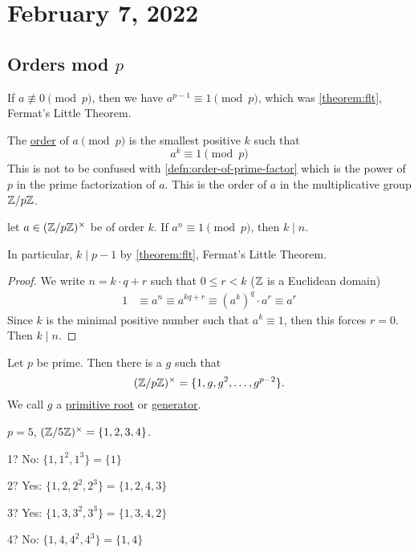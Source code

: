 
\section{February 7, 2022}
\subsection{Orders mod \texorpdfstring{$p$}{p}}
\recall If $a\not\equiv 0\pmod{p}$, then we have $a^{p-1}\equiv 1\pmod{p}$, which was \cref{theorem:flt}, Fermat's Little Theorem.

\begin{definition}
    The \ul{order} of $a \pmod{p}$ is the smallest positive $k$ such that
    \begin{equation*}
        a^k\equiv 1\pmod{p}
    \end{equation*}
    This is not to be confused with \cref{defn:order-of-prime-factor} which is the power of $p$ in the prime factorization of $a$. This is the order of $a$ in the multiplicative group $\mathbb Z/p\mathbb Z$.
\end{definition}

\begin{proposition}
    let $a\in (\mathbb Z/p\mathbb Z)^\times$ be of order $k$. If $a^n\equiv 1\pmod{p}$, then $k\mid n$.

    In particular, $k\mid p-1$ by \cref{theorem:flt}, Fermat's Little Theorem.
\end{proposition}
\begin{proof}
    We write $n = k\cdot q + r$ such that $0\leq r < k$ ($\mathbb Z$ is a Euclidean domain)
    \begin{align*}
        1 & \equiv a^n\equiv a^{kq+r} \equiv (a^k)^q\cdot a^r\equiv a^r
    \end{align*}
    Since $k$ is the minimal positive number such that $a^k\equiv 1$, then this forces $r = 0$. Then $k\mid n$.
\end{proof}

\begin{theorem}
    Let $p$ be prime. Then there is a $g$ such that
    \[(\mathbb Z/p\mathbb Z)^\times = \{1, g, g^2, \dots, g^{p-2}\}.\]
    We call $g$ a \ul{primitive root} or \ul{generator}.
\end{theorem}
\begin{example}
    $p = 5$, $(\mathbb Z/5\mathbb Z)^\times = \{1, 2, 3, 4\}$.

    1? No: $\{1, 1^2, 1^3\} = \{1\}$

    2? Yes: $\{1, 2, 2^2, 2^3\} = \{1, 2, 4, 3\}$

    3? Yes: $\{1, 3, 3^2, 3^3\} = \{1, 3, 4, 2\}$

    4? No: $\{1, 4, 4^2, 4^3\} = \{1, 4\}$
\end{example}

